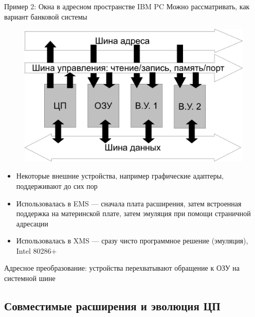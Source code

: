 \documentclass[xetex,aspectratio=43]{beamer}
\begin{document}
\begin{frame}{Пример 2: Окна в адресном пространстве IBM PC}
    Можно рассматривать, как вариант банковой системы

    \begin{figure}
        \includegraphics[page=4,height=0.4\textheight]{img/06.Mem_Models-crop.pdf}
    \end{figure}

    \begin{itemize}
        \tightlist
        \item
        Некоторые внешние устройства, например графические адаптеры,
        поддерживают до сих пор
        \item
        Использовалась в EMS --- сначала плата расширения, затем встроенная
        поддержка на материнской плате, затем эмуляция при помощи страничной
        адресации
    \end{itemize}

    \pause

    \begin{itemize}
        \tightlist
        \item
        Использовалась в XMS --- сразу чисто программное решение (эмуляция),
        Intel 80286+
    \end{itemize}

    Адресное преобразование: устройства перехватывают обращение к ОЗУ на
    системной шине
\end{frame}

\subsection{Совместимые расширения и эволюция ЦП}
\end{document}
